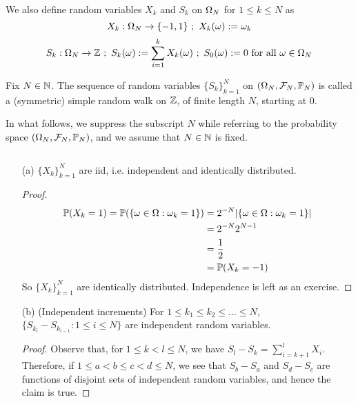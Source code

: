 \documentclass[main]{subfiles}
\begin{document}
We also define random variables $ X_k $ and $ S_k $ on $ \Omega_N $ for $ 1\le k\le N $ as
$$ X_k:\Omega_N\to\{-1,1\}\ ;\  X_k(\omega):=\omega_k$$
$$ S_k:\Omega_N\to\mathbb Z\ ;\  S_k(\omega):=\sum_{i=1}^kX_k(\omega)\ ;\  S_0(\omega):=0 \text{ for all } \omega\in\Omega_N$$
\begin{definition}
    Fix $ N\in\mathbb N $. The sequence of random variables $ \{S_k\}_{k=1}^N $ on $ (\Omega_N,\mathcal F_N, \mathbb P_N) $ is called a (symmetric) simple random walk on $\mathbb Z$, of finite length $ N $, starting at $ 0 $.
\end{definition}
In what follows, we suppress the subscript $ N $ while referring to the probability space $ (\Omega_N,\mathcal F_N, \mathbb P_N) $, and we assume that $ N\in\mathbb N $ is fixed.
\begin{obs}
    $\,$ \normalfont
    \begin{enumerate}
        \item[(a)] $\{X_k\}_{k=1}^N $ are iid, i.e. independent and identically distributed.
            \begin{proof}
                \begin{align*}
                    \mathbb P(X_k=1)=\mathbb P(\{\omega\in\Omega:\omega_k=1\}) & =2^{-N} |\{\omega\in\Omega:\omega_k=1\}| \\
                                                     & =2^{-N}2^{N-1}               \\
                                                     & =\frac{1}{2}                 \\
                                                     & =\mathbb P(X_k=-1)
                \end{align*}
                So $ \{X_k\}_{k=1}^N $ are identically distributed. Independence is left as an exercise.
            \end{proof}
            \item[(b)](Independent increments) For $ 1\le k_1\le k_2\le \ldots\le N $, $ \{S_{k_i}-S_{k_{i-1}}:1\le i\le N\} $ are independent random variables.


            \begin{proof}
                Observe that, for $ 1\le k<l\le N $, we have $ S_l-S_k=\sum_{i=k+1}^lX_i $. Therefore, if $ 1\le a<b\le c<d\le N $, we see that $ S_b-S_a $ and $ S_d-S_c $ are functions of disjoint sets of independent random variables, and hence the claim is true.
            \end{proof}


\end{enumerate}
\end{obs}
\end{document}
